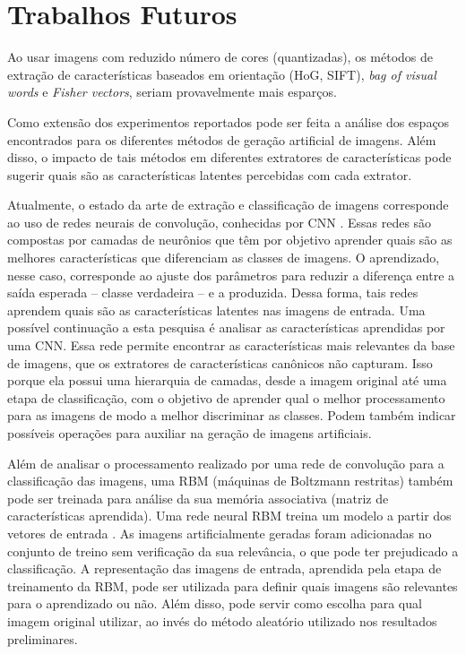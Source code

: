 \section{Trabalhos Futuros}

Ao usar imagens com reduzido número de cores (quantizadas), os métodos de extração de características baseados em orientação (HoG, SIFT), \textit{bag of visual words} e \textit{Fisher vectors}, seriam provavelmente mais esparços.

Como extensão dos experimentos reportados pode ser feita a análise dos espaços encontrados para os diferentes métodos de geração artificial de imagens. Além disso, o impacto de tais métodos em diferentes extratores de características pode sugerir quais são as características latentes percebidas com cada extrator.

Atualmente, o estado da arte de extração e classificação de imagens corresponde ao uso de redes neurais de convolução, conhecidas por CNN \cite{Schmidhuber2014}. Essas redes são compostas por camadas de neurônios que têm por objetivo aprender quais são as melhores características que diferenciam as classes de imagens. O aprendizado, nesse caso, corresponde ao ajuste dos parâmetros para reduzir a diferença entre a saída esperada -- classe verdadeira -- e a produzida. Dessa forma, tais redes aprendem quais são as características latentes nas imagens de entrada. Uma possível continuação a esta pesquisa é analisar as características aprendidas por uma CNN. Essa rede permite encontrar as características mais relevantes da base de imagens, que os extratores de características canônicos não capturam. Isso porque ela possui uma hierarquia de camadas, desde a imagem original até uma etapa de classificação, com o objetivo de aprender qual o melhor processamento para as imagens de modo a melhor discriminar as classes. Podem também indicar possíveis operações para auxiliar na geração de imagens artificiais.

Além de analisar o processamento realizado por uma rede de convolução para a classificação das imagens, uma RBM (máquinas de Boltzmann restritas) também pode ser treinada para análise da sua memória associativa (matriz de características aprendida). Uma rede neural RBM treina um modelo a partir dos vetores de entrada \cite{Fischer2014}. As imagens artificialmente geradas foram adicionadas no conjunto de treino sem verificação da sua relevância, o que pode ter prejudicado a classificação. A representação das imagens de entrada, aprendida pela etapa de treinamento da RBM, pode ser utilizada para definir quais imagens são relevantes para o aprendizado ou não. Além disso, pode servir como escolha para qual imagem original utilizar, ao invés do método aleatório utilizado nos resultados preliminares.

